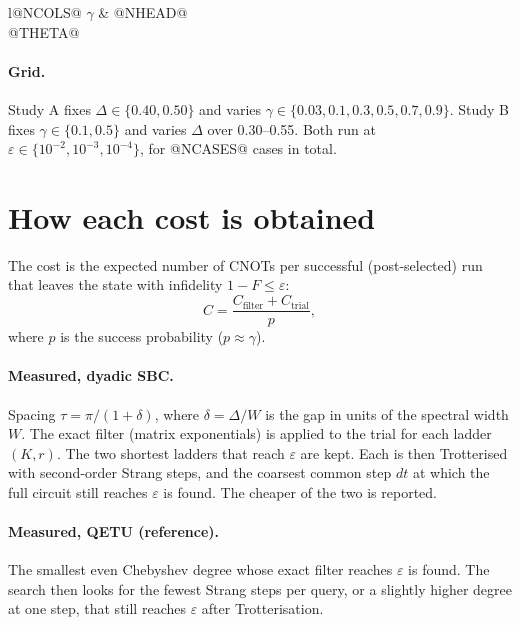 \documentclass[10pt]{article}
\begin{document}
\begin{table}[h]\centering\small
\caption{Rotation angle $\theta$ that sets each overlap $\gamma$ (shown at $\Delta=0.40$).}\label{tab:theta}
\begin{tabular}{l@NCOLS@}\toprule
$\gamma$ & @NHEAD@ \\\midrule
@THETA@
\bottomrule\end{tabular}
\end{table}

\paragraph{Grid.} Study A fixes $\Delta\in\{0.40,0.50\}$ and varies $\gamma\in\{0.03,0.1,0.3,0.5,0.7,0.9\}$.
Study B fixes $\gamma\in\{0.1,0.5\}$ and varies $\Delta$ over 0.30--0.55. Both run at
$\varepsilon\in\{10^{-2},10^{-3},10^{-4}\}$, for @NCASES@ cases in total.

\section{How each cost is obtained}

The cost is the expected number of CNOTs per successful (post-selected) run that leaves the state with
infidelity $1-F\le\varepsilon$:
\begin{equation}
C=\frac{C_\text{filter}+C_\text{trial}}{p},
\end{equation}
where $p$ is the success probability ($p\approx\gamma$).

\paragraph{Measured, dyadic SBC.} Spacing $\tau=\pi/(1+\delta)$, where $\delta=\Delta/W$ is the gap in units of the
spectral width $W$. The exact filter (matrix exponentials) is applied to the trial for each ladder $(K,r)$. The
two shortest ladders that reach $\varepsilon$ are kept. Each is then Trotterised with second-order Strang steps,
and the coarsest common step $dt$ at which the full circuit still reaches $\varepsilon$ is found. The cheaper of
the two is reported.

\paragraph{Measured, QETU (reference).} The smallest even Chebyshev degree whose exact filter reaches
$\varepsilon$ is found. The search then looks for the fewest Strang steps per query, or a slightly higher degree
at one step, that still reaches $\varepsilon$ after Trotterisation.
\end{document}
